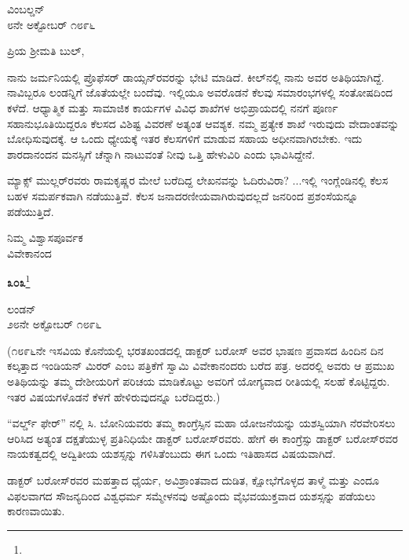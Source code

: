 \begin{flushright}
ವಿಂಬಲ್ಡನ್\\೮ನೇ ಅಕ್ಟೋಬರ್ ೧೮೯೬
\end{flushright}

\noindent
ಪ್ರಿಯ ಶ‍್ರೀಮತಿ ಬುಲ್,

ನಾನು ಜರ್ಮನಿಯಲ್ಲಿ ಪ್ರೊಫೆಸರ್ ಡಾಯ್ಸನ್‌ರವರನ್ನು ಭೇಟಿ ಮಾಡಿದೆ. ಕೀಲ್‌ನಲ್ಲಿ ನಾನು ಅವರ ಅತಿಥಿಯಾಗಿದ್ದೆ. ನಾವಿಬ್ಬರೂ ಲಂಡನ್ನಿಗೆ ಜೊತೆಯಲ್ಲೇ ಬಂದೆವು. ಇಲ್ಲಿಯೂ ಅವರೊಡನೆ ಕೆಲವು ಸಮಾರಂಭಗಳಲ್ಲಿ ಸಂತೋಷದಿಂದ ಕಳೆದೆ. ಆಧ್ಯಾತ್ಮಿಕ ಮತ್ತು ಸಾಮಾಜಿಕ ಕಾರ್ಯಗಳ ವಿವಿಧ ಶಾಖೆಗಳ ಅಭಿಪ್ರಾಯದಲ್ಲಿ ನನಗೆ ಪೂರ್ಣ ಸಹಾನುಭೂತಿಯಿದ್ದರೂ ಕೆಲಸದ ವಿಶಿಷ್ಟ ವಿವರಣೆ ಅತ್ಯಂತ ಆವಶ್ಯಕ. ನಮ್ಮ ಪ್ರತ್ಯೇಕ ಶಾಖೆ ಇರುವುದು ವೇದಾಂತವನ್ನು ಬೋಧಿಸುವುದಕ್ಕೆ. ಆ ಒಂದು ಧ್ಯೇಯಕ್ಕೆ ಇತರ ಕೆಲಸಗಳಿಗೆ ಮಾಡುವ ಸಹಾಯ ಅಧೀನವಾಗಿರಬೇಕು. ಇದು ಶಾರದಾನಂದನ ಮನಸ್ಸಿಗೆ ಚೆನ್ನಾಗಿ ನಾಟುವಂತೆ ನೀವು ಒತ್ತಿ ಹೇಳುವಿರಿ ಎಂದು ಭಾವಿಸಿದ್ದೇನೆ.

ಮ್ಯಾಕ್ಸ್ ಮುಲ್ಲರ್‌ರವರು ರಾಮಕೃಷ್ಣರ ಮೇಲೆ ಬರೆದಿದ್ದ ಲೇಖನವನ್ನು ಓದಿರುವಿರಾ? ...ಇಲ್ಲಿ ಇಂಗ್ಲೆಂಡಿನಲ್ಲಿ ಕೆಲಸ ಬಹಳ ಸಮರ್ಪಕವಾಗಿ ನಡೆಯುತ್ತಿವೆ. ಕೆಲಸ ಜನಾದರಣೀಯವಾಗಿರುವುದಲ್ಲದೆ ಜನರಿಂದ ಪ್ರಶಂಸೆಯನ್ನೂ ಪಡೆಯುತ್ತಿದೆ.

{\flushright
ನಿಮ್ಮ ವಿಶ್ವಾಸಪೂರ್ವಕ\\ವಿವೇಕಾನಂದ\par}

\begin{center}
\textbf{೩೦೩}\footnote{}
\end{center}

\begin{flushright}
ಲಂಡನ್\\೨೮ನೇ ಅಕ್ಟೋಬರ್ ೧೮೯೬
\end{flushright}

(೧೮೯೬ನೇ ಇಸವಿಯ ಕೊನೆಯಲ್ಲಿ ಭರತಖಂಡದಲ್ಲಿ ಡಾಕ್ಟರ್ ಬರೋಸ್ ಅವರ ಭಾಷಣ ಪ್ರವಾಸದ ಹಿಂದಿನ ದಿನ ಕಲ್ಕತ್ತಾದ ಇಂಡಿಯನ್ ಮಿರರ್ ಎಂಬ ಪತ್ರಿಕೆಗೆ ಸ್ವಾಮಿ ವಿವೇಕಾನಂದರು ಬರೆದ ಪತ್ರ. ಅದರಲ್ಲಿ ಅವರು ಆ ಪ್ರಮುಖ ಅತಿಥಿಯನ್ನು ತಮ್ಮ ದೇಶೀಯರಿಗೆ ಪರಿಚಯ ಮಾಡಿಕೊಟ್ಟು ಅವರಿಗೆ ಯೋಗ್ಯವಾದ ರೀತಿಯಲ್ಲಿ ಸಲಹೆ ಕೊಟ್ಟಿದ್ದರು. ಇತರ ವಿಷಯಗಳೊಡನೆ ಕೆಳಗೆ ಹೇಳಿರುವುದನ್ನೂ ಬರೆದಿದ್ದರು.)
\vspace{0.2cm}

“ವರ್ಲ್ಡ್ ಫೇರ್” ನಲ್ಲಿ ಸಿ. ಬೋನಿಯವರು ತಮ್ಮ ಕಾಂಗ್ರೆಸ್ಸಿನ ಮಹಾ ಯೋಜನೆಯನ್ನು ಯಶಸ್ವಿಯಾಗಿ ನೆರವೇರಿಸಲು ಆರಿಸಿದ ಅತ್ಯಂತ ದಕ್ಷತೆಯುಳ್ಳ ಪ್ರತಿನಿಧಿಯೇ ಡಾಕ್ಟರ್ ಬರೋಸ್‌ರವರು. ಹೇಗೆ ಈ ಕಾಂಗ್ರೆಸ್ಸು ಡಾಕ್ಟರ್ ಬರೋಸ್‌ರವರ ನಾಯಕತ್ವದಲ್ಲಿ ಅದ್ವಿತೀಯ ಯಶಸ್ಸನ್ನು ಗಳಿಸಿತೆಂಬುದು ಈಗ ಒಂದು ಇತಿಹಾಸದ ವಿಷಯವಾಗಿದೆ.
\vspace{0.2cm}

ಡಾಕ್ಟರ್ ಬರೋಸ್‌ರವರ ಮಹತ್ತಾದ ಧೈರ್ಯ, ಅವಿಶ್ರಾಂತವಾದ ದುಡಿತ, ಕ್ಷೋಭೆಗೊಳ್ಳದ ತಾಳ್ಮೆ ಮತ್ತು ಎಂದೂ ವಿಫಲವಾಗದ ಸೌಜನ್ಯದಿಂದ ವಿಶ್ವಧರ್ಮ ಸಮ್ಮೇಳನವು ಅಷ್ಟೊಂದು ವೈಭವಯುಕ್ತವಾದ ಯಶಸ್ಸನ್ನು ಪಡೆಯಲು ಕಾರಣವಾಯಿತು.
\vspace{0.2cm}

